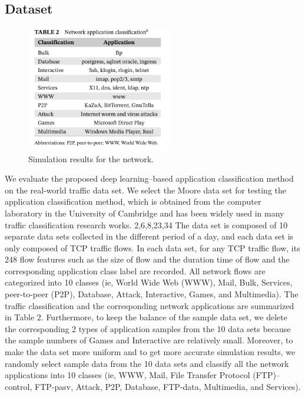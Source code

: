 \documentclass[10pt,journal,compsoc]{IEEEtran}
\begin{document}
\subsection{Dataset}

\begin{figure}[!t]
\centering
\includegraphics[width=2.5in]{dataset_distribution}
\caption{Simulation results for the network.}
\label{fig_sim}
\end{figure}


\cite{}
We evaluate the proposed deep learning–based application classification method on the real-world traffic data set. We
select the Moore data set for testing the application classification method, which is obtained from the computer laboratory
in the University of Cambridge and has been widely used in many traffic classification research works.
2,6,8,23,34
The data
set is composed of 10 separate data sets collected in the different period of a day, and each data set is only composed
of TCP traffic flows. In each data set, for any TCP traffic flow, its 248 flow features such as the size of flow and the
duration time of flow and the corresponding application class label are recorded. All network flows are categorized into
10 classes (ie, World Wide Web (WWW), Mail, Bulk, Services, peer-to-peer (P2P), Database, Attack, Interactive, Games,
and Multimedia). The traffic classification and the corresponding network applications are summarized in Table 2.
Furthermore, to keep the balance of the sample data set, we delete the corresponding 2 types of application samples
from the 10 data sets because the sample numbers of Games and Interactive are relatively small. Moreover, to make the
data set more uniform and to get more accurate simulation results, we randomly select sample data from the 10 data sets
and classify all the network applications into 10 classes (ie, WWW, Mail, File Transfer Protocol (FTP)–control, FTP-pasv,
Attack, P2P, Database, FTP-data, Multimedia, and Services).
\end{document}

